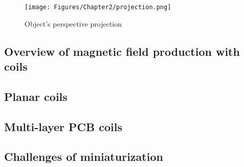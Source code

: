 \begin{figure}[th]
    \centering
    \texttt{[image: Figures/Chapter2/projection.png]}
    \caption[Perspective projection of an object]{Object's perspective projection}
    \label{fig:Opp}
\end{figure}

\subsection{Overview of magnetic field production with coils}

\subsection{Planar coils}

\subsection{Multi-layer PCB coils}

\subsection{Challenges of miniaturization}
